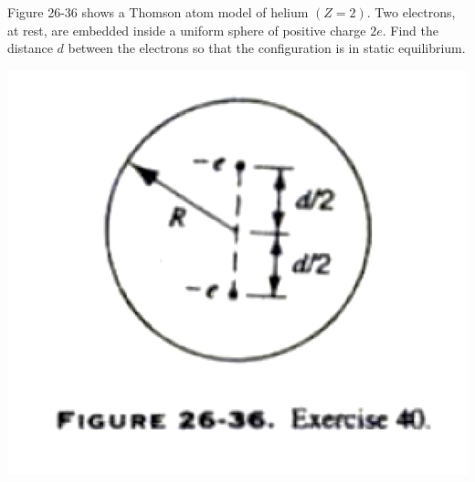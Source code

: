 \documentclass[11pt,letterpaper,boxed]{hmcpset}
\begin{document}
	\begin{problem}[HRK E36.40]
		Figure 26-36 shows a Thomson atom model of helium $(Z = 2)$. Two electrons, at rest, are embedded inside a uniform sphere of positive charge $2e$. Find the distance $d$ between the electrons so that the configuration is in static equilibrium.
		
		\begin{center}
			\includegraphics[scale=0.55]{26-36.png}
		\end{center}

	\end{problem}
	
	\begin{solution}
		\vfill
	\end{solution}
	\newpage
	
\end{document}
